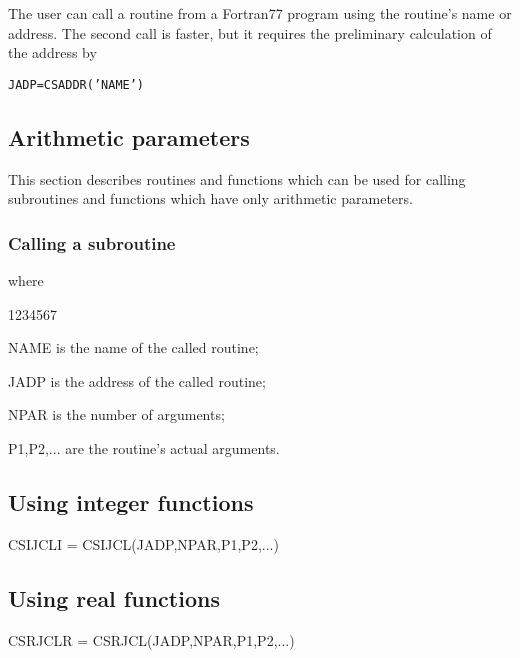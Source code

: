 The user can call a \COMIS{} routine from a Fortran77 program
using the routine's name or address. The second call is faster, but it
requires the preliminary calculation of the address by

\begin{alltt}
    JADP=CSADDR('NAME')
\end{alltt}
 
\subsection*{Arithmetic parameters}

This section describes routines and functions which can be used
for calling \COMIS{} subroutines and functions which have only 
arithmetic parameters.

\newpage %

\subsubsection*{Calling a \COMIS{} subroutine}


where
\begin{DLtt}{1234567}
\item[NAME] is the name of the called \COMIS{} routine;
\item[JADP] is the address of the called \COMIS{} routine;
\item[NPAR] is the number of arguments;
\item[P1,P2,...] are the routine's actual arguments.
\end{DLtt}
 
\subsection*{Using integer \COMIS{} functions}

%
        {CSIJCL}{I = CSIJCL(JADP,NPAR,P1,P2,...)}

\subsection*{Using real \COMIS{} functions}
 
%
        {CSRJCL}{R = CSRJCL(JADP,NPAR,P1,P2,...)}

